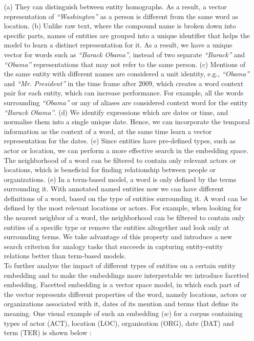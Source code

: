 (a) They can distinguish between entity homographs. As a result, a vector representation of \emph{``Washington''} as a person is different from the same word as location. (b) Unlike raw text, where the compound name is broken down into specific parts, names of entities are  grouped into a unique identifier that helps the model to learn a distinct representation for it. As a result, we have a unique vector for words such as  \emph{``Barack Obama''}, instead of two separate \emph{``Barack''} and \emph{``Obama''} representations that may not refer to the same person. (c) Mentions of the same entity with different names are considered a unit identity, e.g., \emph{``Obama''} and \emph{``Mr. President''} in the time frame after $2009$, which creates a  word context pair for each entity, which can increase performance. For example, all the words surrounding \emph{``Obama''} or any of  aliases are considered  context word for the entity \emph{``Barack Obama''}. (d) We identify expressions which are dates or time, and normalise them into a single unique date. Hence, we can incorporate the temporal information as the context of a word,  at the same time learn a vector representation for the dates. (e) Since entities have pre-defined types, such as actor or location, we can perform a more effective search in the embedding space. The neighborhood of a word can be filtered to contain only relevant actors or locations, which is beneficial for finding relationship between people or organizations. (e) In a term-based model, a word is only defined by the terms surrounding it. With annotated named entities now we can have different definitions of a word, based on the type of entities surrounding it. A word can be defined by the most relevant locations or actors. For example, when looking for the nearest neighbor of a word, the neighborhood can be filtered to contain only entities of a specific type or remove the entities altogether and look only at surrounding terms. We take advantage of this property and introduce a new search criterion for analogy tasks that succeeds in capturing entity-entity relations better than term-based models. \\
\noindent
To further analyse the impact of different types of entities on a certain entity embedding and to make the embeddings more interpretable we introduce facetted embedding. Facetted embedding is a vector space model, in which each part of the vector represents different properties of the word, namely locations, actors or organizations associated with it, dates of its mention and terms that define its meaning. One visual example of such an embedding ($w$) for a corpus containing types of actor (ACT), location (LOC), organisation (ORG), date (DAT) and term (TER) is shown below : \\
